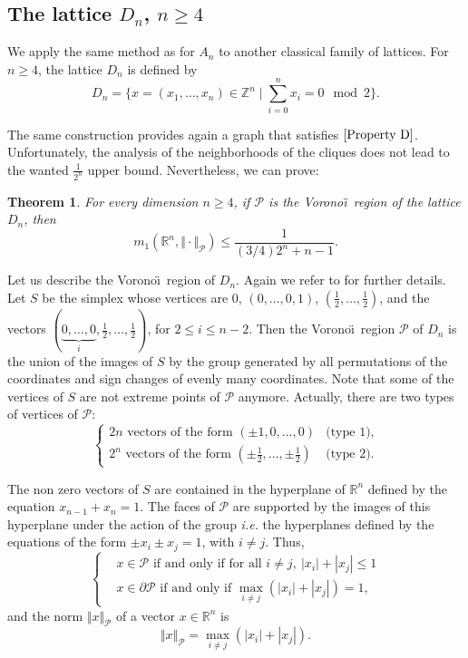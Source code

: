 \documentclass{amsart}                     %
\newtheorem{theo}{Theorem}
\newcommand{\Z}{{\mathbb Z}}
\newcommand{\R}{{\mathbb R}}
\begin{document}
\subsection{The lattice $D_n$, $n\geq 4$}

We apply the same method as for $A_n$ to another classical family of lattices. For $n\geq 4$, the lattice $D_n$ is defined by
$$D_n=\{ x=(x_1,\ldots,x_n)\in\Z^n\mid  \sum_{i=0}^n x_i = 0 \mod 2\}.$$ 

The same construction provides again a graph that satisfies $\eqref{Property D}$. Unfortunately, the analysis of the neighborhoods of the cliques does not lead to the wanted $\frac{1}{2^n}$ upper bound. Nevertheless, we can prove: 

\begin{theo}\label{DnTheo}
For every dimension $n\geq 4$, if $\mathcal{P}$ is the Vorono\"\i\  region of the lattice $D_n$, then
$$m_1(\R^n,\Vert   \cdot\Vert  _\mathcal{P})\leq \frac{1}{(3/{4})2^n+n-1}.$$
\end{theo}

Let us describe the Vorono\"\i\  region of $D_n$. Again we refer to \cite{Conway:1987:SLG:39091} for further details. Let $S$ be the simplex whose vertices are $0$, $(0,\ldots,0,1)$, $\left(\frac{1}{2}, \ldots, \frac{1}{2}\right)$, and the vectors $\left(\underbrace{0,\ldots,0}_{i},\frac{1}{2}, \ldots, \frac{1}{2}\right)$, for $2\leq i\leq n-2$. Then  the Vorono\"\i\  region $\mathcal{P}$ of $D_n$ is the union of the images of $S$ by the group generated by all permutations of the coordinates and sign changes of evenly many coordinates. 
Note that some of the vertices of $S$ are not extreme points of $\mathcal{P}$ anymore. Actually, there are two types of vertices of $\mathcal{P}$:
$$
\begin{cases}
2n \text{ vectors of the form } (\pm 1, 0,\ldots,0) &\text{(type 1),}  \\
2^n \text{ vectors of the form } \left(\pm \frac{1}{2},\ldots,\pm \frac{1}{2}\right) & \text{(type 2).}
\end{cases}
$$

The non zero vectors of $S$ are contained in the hyperplane of $\R^n$ defined by the equation $x_{n-1}+x_n=1$. The faces of $\mathcal{P}$ are supported by the images of this hyperplane under the action of the group \textit{i.e.} the hyperplanes defined by the equations of the form $\pm x_i \pm x_j =1$, with $i\neq j$. Thus,
$$\begin{cases} & x\in \mathcal{P} \text{ if and only if for all } i\neq j,\  |x_i|+|x_j|\leq 1 \\ &  x\in \partial \mathcal{P} \text{ if and only if  } \max_{i\neq j}(|x_i|+|x_j|)=1, \end{cases}$$
and the norm $\Vert x\Vert_\mathcal{P}$ of a vector $x\in \R^n$ is 
$$ \Vert  x\Vert  _\mathcal{P} = \max_{i\neq j}(|x_i|+|x_j|) .$$
\end{document}
